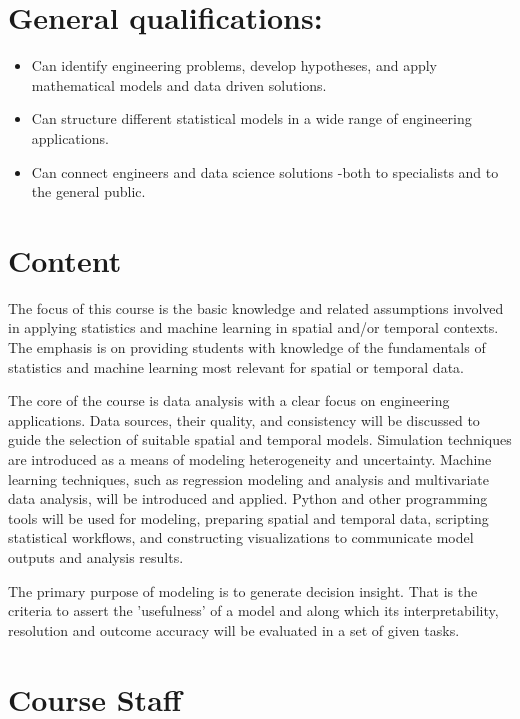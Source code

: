 \documentclass[letterpaper,12pt,oneside]{article}
\begin{document}
\section*{General qualifications:}

\begin{itemize}
\item Can identify engineering problems, develop hypotheses, and apply mathematical models and data driven solutions.
\item Can structure different statistical models in a wide range of engineering applications.
\item Can connect engineers and data science solutions -both to specialists and to the general public.

\end{itemize}



\section*{Content}


The focus of this course is the basic knowledge and related assumptions involved in applying statistics and machine learning in spatial and/or temporal contexts. The emphasis is on providing students with knowledge of the fundamentals of statistics and machine learning most relevant for spatial or temporal data.

The core of the course is data analysis with a clear focus on engineering applications. Data sources, their quality, and consistency will be discussed to guide the selection of suitable spatial and temporal models. Simulation techniques are introduced as a means of modeling heterogeneity and uncertainty. Machine learning techniques, such as regression modeling and analysis and multivariate data analysis, will be introduced and applied. Python and other programming tools will be used for modeling, preparing spatial and temporal data, scripting statistical workflows, and constructing visualizations to communicate model outputs and analysis results.

The primary purpose of modeling is to generate decision insight. That is the criteria to assert the 'usefulness’ of a model and along which its interpretability, resolution and outcome accuracy will be evaluated in a set of given tasks.




\section*{Course Staff}
\end{document}
